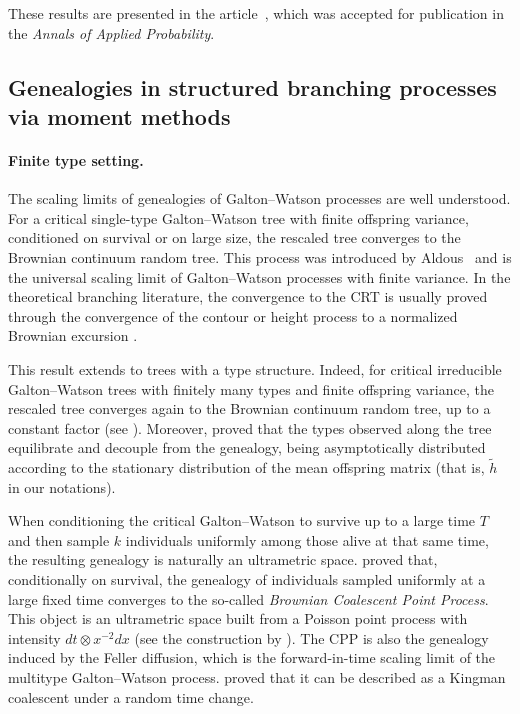 These results are presented in the article~\cite{andré2026sharpllogl}, which was accepted for publication in the \emph{Annals of Applied Probability}.

\subsection{Genealogies in structured branching processes via moment methods}

\paragraph{Finite type setting.}
The scaling limits of genealogies of Galton--Watson processes are well understood. For a critical single-type Galton--Watson tree with finite offspring variance, conditioned on survival or on large size, the rescaled tree converges to the Brownian continuum random tree. This process was introduced by Aldous~\cite{aldous_continuum_1991, aldous_continuum_1993} and is the universal scaling limit of Galton--Watson processes with finite variance. In the theoretical branching literature, the convergence to the CRT is usually proved through the convergence of the contour or height process to a normalized Brownian excursion \cite{aldous_continuum_1991, le_gall_brownian_1991}. 

This result extends to trees with a type structure. Indeed, for critical irreducible Galton--Watson trees with finitely many types and finite offspring variance, the rescaled tree converges again to the Brownian continuum random tree, up to a constant factor (see \citet{miermont_invariance_2008}). Moreover, \citet{miermont_invariance_2008} proved that the types observed along the tree equilibrate and decouple from the genealogy, being asymptotically distributed according to the stationary distribution of the mean offspring matrix (that is, $\tilde h$ in our notations).

When conditioning the critical Galton--Watson to survive up to a large time $T$ and then sample $k$ individuals uniformly among those alive at that same time, the resulting genealogy is naturally an ultrametric space. \citet*{popovic_coalescent_2014} proved that, conditionally on survival, the genealogy of individuals sampled uniformly at a large fixed time converges to the so-called \emph{Brownian Coalescent Point Process}. This object is an ultrametric space built from a Poisson point process with intensity $dt\otimes x^{-2}dx$ (see the construction by \citet{popovic_asymptotic_2004}). 
The CPP is also the genealogy induced by the Feller diffusion, which is the forward-in-time scaling limit of the multitype Galton--Watson process. \citet*{7_authors_paper} proved that it can be described as a Kingman coalescent under a random time change. 



